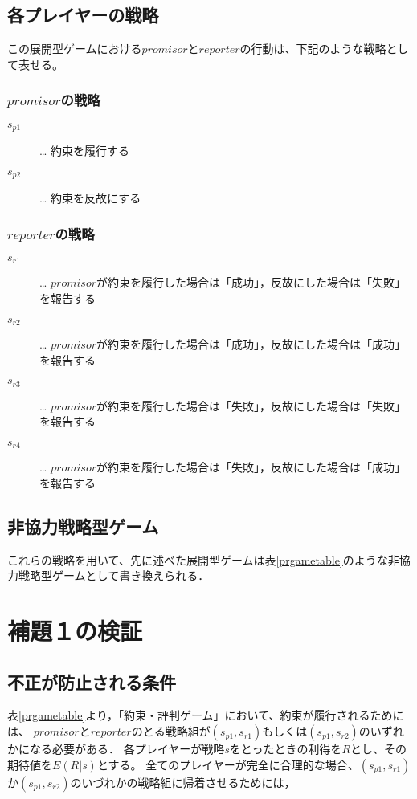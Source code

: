

\subsection{各プレイヤーの戦略}
この展開型ゲームにおける$promisor$と$reporter$の行動は、下記のような戦略として表せる。

\subsubsection{$promisor$の戦略}
\begin{description}
  \item[$s_{p1}$]… 約束を履行する
  \item[$s_{p2}$]… 約束を反故にする
\end{description}

\subsubsection{$reporter$の戦略}
\begin{description}
  \item[$s_{r1}$]… $promisor$が約束を履行した場合は「成功」，反故にした場合は「失敗」を報告する
  \item[$s_{r2}$]… $promisor$が約束を履行した場合は「成功」，反故にした場合は「成功」を報告する
  \item[$s_{r3}$]… $promisor$が約束を履行した場合は「失敗」，反故にした場合は「失敗」を報告する
  \item[$s_{r4}$]… $promisor$が約束を履行した場合は「失敗」，反故にした場合は「成功」を報告する
\end{description}

\subsection{非協力戦略型ゲーム}
これらの戦略を用いて、先に述べた展開型ゲームは表\ref{prgametable}のような非協力戦略型ゲームとして書き換えられる．


\section{補題１の検証}
\subsection{不正が防止される条件}
表\ref{prgametable}より，「約束・評判ゲーム」において、約束が履行されるためには、
$promisor$と$reporter$のとる戦略組が$ (s_{p1}, s_{r1})$もしくは$(s_{p1}, s_{r2})$のいずれかになる必要がある．
各プレイヤーが戦略$s$をとったときの利得を$R$とし、その期待値を$E(R|s)$とする。
全てのプレイヤーが完全に合理的な場合、$(s_{p1}, s_{r1})$か$(s_{p1}, s_{r2})$のいづれかの戦略組に帰着させるためには，

